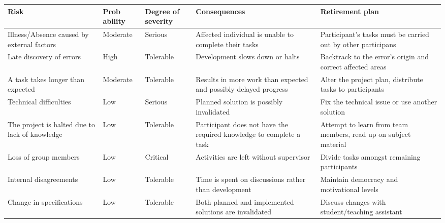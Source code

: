 \documentclass{article}
\begin{document}
\begin{tabular}{|p{5cm}|p{5cm}|p{5cm}|p{5cm}|p{5cm}|}
\hline
Risk & Prob\newline
ability & Degree of severity & Consequences & Retirement plan \\ \hline
Illness/Absence caused by external factors & Moderate & Serious & Affected
individual is unable to complete their tasks & Participant's tasks must be
carried out by other participans \\ \hline
Late discovery of errors & High & Tolerable & Development slows down or halts
& Backtrack to the error's origin and correct affected areas \\ \hline
A task takes longer than expected & Moderate & Tolerable & Results in more
work than expected and possibly delayed progress & Alter the project plan,
distribute tasks to participants \\ \hline
Technical difficulties & Low & Serious & Planned solution is possibly
invalidated & Fix the technical issue or use another solution \\ \hline
The project is halted due to lack of knowledge & Low & Tolerable & 
Participant does not have the required knowledge to complete a task & 
Attempt to learn from team members, read up on subject material \\ \hline
Loss of group members & Low & Critical & Activities are left without
supervisor & Divide tasks amongst remaining participants \\ \hline
Internal disagreements & Low & Tolerable & Time is spent on discussions
rather than development & Maintain democracy and motivational levels \\ 
\hline
Change in specifications & Low & Tolerable & Both planned and implemented
solutions are invalidated & Discuss changes with student/teaching assistant
\\ \hline
\end{tabular}
\end{document}
